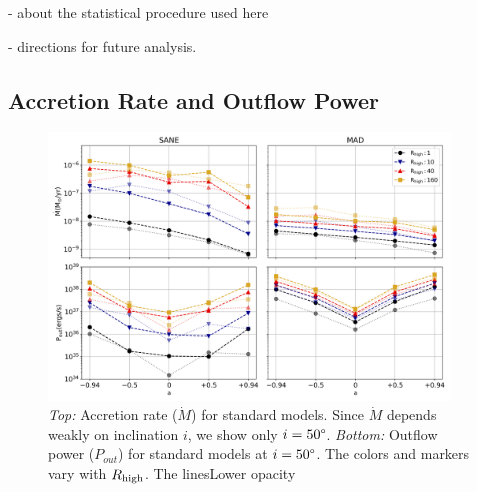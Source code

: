 - about the statistical procedure used here

- directions for future analysis.

\subsection{Accretion Rate and Outflow Power}


\begin{figure}
\centering
\includegraphics[width=0.95\textwidth]{figures/bhac_kharma_average_mdot_pout.png}
\caption{{\it Top:} Accretion rate ($\dot{M}$) for standard models. Since $\dot{M}$ depends weakly on inclination $i$, we show only $i=50\degree$. {\it Bottom:} Outflow power ($P_{out}$) for standard models at $i = 50\degree$. The colors and markers vary with $R_\mathrm{high}$. The linesLower opacity }
\label{fig:accretion_outflow_power_illinois_thermal}
\end{figure}

